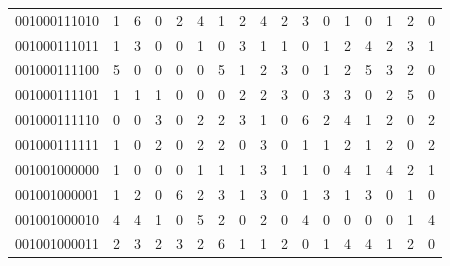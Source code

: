 \documentclass[10pt,a4paper]{article}
\begin{document}
\begin{longtable}{ |c|c|c|c|c|c|c|c|c|c|c|c|c|c|c|c|c| }
    001000111010              & 1                            & 6                                & 0                            & 2                              & 4   & 1   & 2   & 4   & 2   & 3   & 0   & 1   & 0   & 1   & 2   & 0   \\
    001000111011              & 1                            & 3                                & 0                            & 0                              & 1   & 0   & 3   & 1   & 1   & 0   & 1   & 2   & 4   & 2   & 3   & 1   \\
    001000111100              & 5                            & 0                                & 0                            & 0                              & 0   & 5   & 1   & 2   & 3   & 0   & 1   & 2   & 5   & 3   & 2   & 0   \\
    001000111101              & 1                            & 1                                & 1                            & 0                              & 0   & 0   & 2   & 2   & 3   & 0   & 3   & 3   & 0   & 2   & 5   & 0   \\
    001000111110              & 0                            & 0                                & 3                            & 0                              & 2   & 2   & 3   & 1   & 0   & 6   & 2   & 4   & 1   & 2   & 0   & 2   \\
    001000111111              & 1                            & 0                                & 2                            & 0                              & 2   & 2   & 0   & 3   & 0   & 1   & 1   & 2   & 1   & 2   & 0   & 2   \\
    001001000000              & 1                            & 0                                & 0                            & 0                              & 1   & 1   & 1   & 3   & 1   & 1   & 0   & 4   & 1   & 4   & 2   & 1   \\
    001001000001              & 1                            & 2                                & 0                            & 6                              & 2   & 3   & 1   & 3   & 0   & 1   & 3   & 1   & 3   & 0   & 1   & 0   \\
    001001000010              & 4                            & 4                                & 1                            & 0                              & 5   & 2   & 0   & 2   & 0   & 4   & 0   & 0   & 0   & 0   & 1   & 4   \\
    001001000011              & 2                            & 3                                & 2                            & 3                              & 2   & 6   & 1   & 1   & 2   & 0   & 1   & 4   & 4   & 1   & 2   & 0   \\

\end{longtable}
\end{document}
